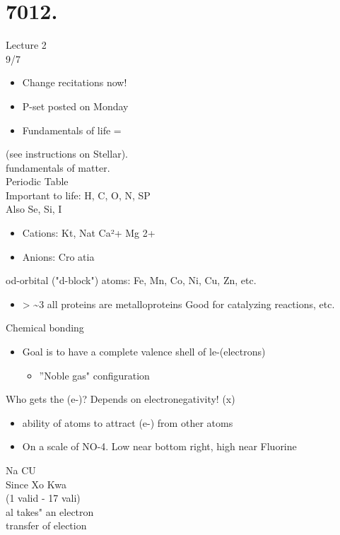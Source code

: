 \documentclass{article}
\begin{document}
 \section{7012.}Lecture 2\\
9/7\\
\begin{itemize}
\item  Change recitations now!
\end{itemize}
\begin{itemize}
\item  P-set posted on Monday
\item  Fundamentals of life =
\end{itemize}
(see instructions on Stellar).\\
fundamentals of matter.\\
Periodic Table\\
Important to life: H, C, O, N, SP\\
Also Se, Si, I
\begin{itemize}
\item  Cations: Kt, Nat Ca²+ Mg 2+
\item  Anions: Cro atia
\end{itemize}
od-orbital ("d-block") atoms: Fe, Mn, Co, Ni, Cu, Zn, etc.
\begin{itemize}
\item > \textasciitilde 3 all proteins are metalloproteins
Good for catalyzing reactions, etc.
\end{itemize}
Chemical bonding
\begin{itemize}
\item  Goal is to have a complete valence shell of le-(electrons)
\begin{itemize}
\item  ''Noble gas" configuration
\end{itemize}
\end{itemize}
Who gets the (e-)? Depends on electronegativity! (x)
\begin{itemize}
\item  ability of atoms to attract (e-) from other atoms
\item  On a scale of NO-4. Low near bottom right, high near Fluorine
\end{itemize}
Na
CU\\
Since Xo Kwa\\
(1 valid - 17 vali)\\
al takes" an electron\\
transfer of election\\
\end{document}
